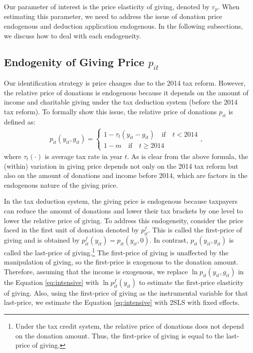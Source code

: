 \documentclass[
  11pt,
  a4paper,
]{article}
\begin{document}
Our parameter of interest is the price elasticity of giving, denoted by \(\varepsilon_p\).
When estimating this parameter,
we need to address the issue of donation price endogenous
and deduction application endogenous.
In the following subsections, we discuss how to deal with each endogeneity.

\hypertarget{endogenity-of-giving-price-p_it}{%
\subsection{\texorpdfstring{Endogenity of Giving Price \(p_{it}\)}{Endogenity of Giving Price p\_\{it\}}}\label{endogenity-of-giving-price-p_it}}

Our identification strategy is price changes due to the 2014 tax reform.
However, the relative price of donations is endogenous
because it depends on the amount of income and charitable giving under the tax deduction system (before the 2014 tax reform).
To formally show this issue, the relative price of donations \(p_{it}\) is defined as:
\begin{align}
  p_{it}(y_{it}, g_{it}) =
  \begin{cases}
    1 - \tau_t(y_{it} - g_{it})  \quad\text{if}\quad t < 2014  \\
    1 - m \quad\text{if}\quad t \ge 2014
  \end{cases}, \label{eq:price}
\end{align}
where \(\tau_t(\cdot)\) is average tax rate in year \(t\).
As is clear from the above formula,
the (within) variation in giving price depends not only on the 2014 tax reform
but also on the amount of donations and income before 2014,
which are factors in the endogenous nature of the giving price.

In the tax deduction system,
the giving price is endogenous
because taxpayers can reduce the amount of donations and
lower their tax brackets by one level to lower the relative price of giving.
To address this endogeneity, consider the price faced in the first unit of donation denoted by \(p^f_{it}\).
This is called the first-price of giving and is obtained by \(p^f_{it}(y_{it}) = p_{it}(y_{it}, 0)\).
In contrast, \(p_{it}(y_{it}, g_{it})\) is called the last-price of giving.\footnote{Under the tax credit system, the relative price of donations does not depend on the donation amount. Thus, the first-price of giving is equal to the last-price of giving.}
The first-price of giving is unaffected by the manipulation of giving,
so the first-price is exogenous to the donation amount.
Therefore, assuming that the income is exogenous,
we replace \(\ln p_{it}(y_{it}, g_{it})\) in the Equation \eqref{eq:intensive} with \(\ln p^f_{it}(y_{it})\)
to estimate the first-price elasticity of giving.
Also, using the first-price of giving as the instrumental variable for that last-price,
we estimate the Equation \eqref{eq:intensive} with 2SLS with fixed effects.
\end{document}
